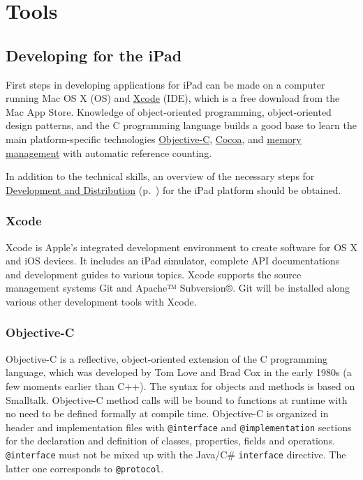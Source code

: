
\section{Tools}

\subsection{Developing for the iPad}

First steps in developing applications for iPad can be made on a computer running Mac OS X (OS) and 
\href{sec:Xcode}{Xcode} (IDE), which is a free download from the Mac App Store.
Knowledge of object-oriented programming, object-oriented design patterns, 
and the C programming language 
builds a good base to learn the main platform-specific technologies 
\href{sec:ObjC}{Objective-C},
\href{sec:Cocoa}{Cocoa}, and
\href{sec:MemoryManagement}{memory management}
with automatic reference counting.

In addition to the technical skills, an overview of the necessary steps for 
\href{sec:DAD}{Development and Distribution} (p.~\pageref{sec:DAD}) for the iPad platform
should be obtained.

\subsubsection{Xcode}
\label{sec:Xcode}

Xcode is Apple's integrated development environment to create software for OS X and iOS devices.
It includes an iPad simulator, complete API documentations and development guides to various topics. 
Xcode supports the source management systems Git and Apache™ Subversion®. 
Git will be installed along various other development tools with Xcode.

\subsubsection{Objective-C}
\label{sec:ObjC}
Objective-C is a reflective, object-oriented extension of the C programming language,
 which was developed by Tom Love and Brad Cox in the early 1980s (a few moments earlier than C++). 
The syntax for objects and methods is based on Smalltalk. 
Objective-C method calls will be bound to functions at runtime with no need to be defined formally at compile time.
Objective-C is organized in header and implementation files 
with \verb+@interface+ and \verb+@implementation+ sections for
the declaration and definition of classes, properties, fields and operations.
\verb+@interface+ must not be mixed up with the Java/C\# \verb+interface+ directive. 
The latter one corresponds to \verb+@protocol+.



